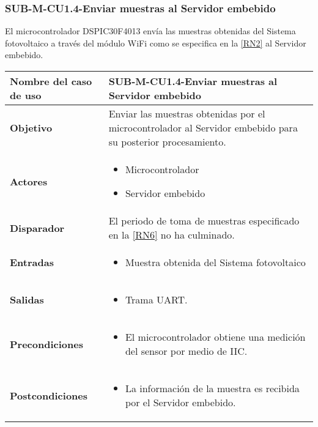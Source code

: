 \subsubsection{SUB-M-CU1.4-Enviar muestras al Servidor embebido}\label{SUB-M-CU1.4}
El microcontrolador DSPIC30F4013 envía las muestras obtenidas del Sistema fotovoltaico a través del módulo WiFi como se especifica en la \ref{RN2} al Servidor embebido.
\begin{longtable}{|J{5cm}|J{10.3cm}|}
	\hline
	\textbf{Nombre del caso de uso} &
		SUB-M-CU1.4-Enviar muestras al Servidor embebido \\ \hline
	\textbf{Objetivo} &
		Enviar las muestras obtenidas por el microcontrolador al Servidor embebido para su posterior procesamiento. \\ \hline
	\textbf{Actores} &
	    \begin{itemize}
		    \item Microcontrolador
		    \item Servidor embebido
		\end{itemize}\\ \hline 
	\textbf{Disparador} & 
		El periodo de toma de muestras especificado en la \ref{RN6} no ha culminado.\\ \hline %
	\textbf{Entradas} & %
		\begin{itemize}%
				\item Muestra obtenida del Sistema fotovoltaico
		\end{itemize}
		\\ \hline 
	\textbf{Salidas} & 
	    \begin{itemize}%
	        \item Trama UART.
	    \end{itemize}\\ \hline
	\textbf{Precondiciones} &%
		\begin{itemize}
		    \item El microcontrolador obtiene una medición del sensor por medio de IIC.
		\end{itemize}\\ \hline
	\textbf{Postcondiciones} &
		\begin{itemize}%
			\item La información de la muestra es recibida por el Servidor embebido.

\end{itemize}
\end{longtable}
